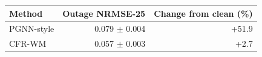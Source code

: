 \begin{tabular}{lrr}
\toprule
Method & Outage NRMSE-25 & Change from clean (\%) \\
\midrule
PGNN-style & 0.079 $\pm$ 0.004 & +51.9 \\
CFR-WM & 0.057 $\pm$ 0.003 & +2.7 \\
\bottomrule
\end{tabular}
